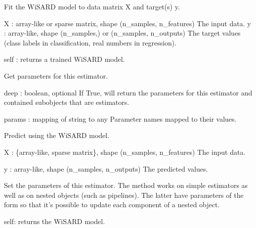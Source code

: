 \documentclass[letterpaper,10pt,english]{sphinxmanual}
\begin{document}
\begin{fulllineitems}
\begin{fulllineitems}
\label{\detokenize{index:wis.WisardClassifier.fit}}
Fit the WiSARD model to data matrix X and target(s) y.

X : array-like or sparse matrix, shape (n\_samples, n\_features)
The input data.
y : array-like, shape (n\_samples,) or (n\_samples, n\_outputs)
The target values (class labels in classification, real numbers in
regression).

self : returns a trained WiSARD model.

\end{fulllineitems}


\begin{fulllineitems}
\label{\detokenize{index:wis.WisardClassifier.get_params}}
Get parameters for this estimator.

deep : boolean, optional
If True, will return the parameters for this estimator and
contained subobjects that are estimators.

params : mapping of string to any
Parameter names mapped to their values.

\end{fulllineitems}


\begin{fulllineitems}
\label{\detokenize{index:wis.WisardClassifier.predict}}
Predict using the WiSARD model.

X : \{array-like, sparse matrix\}, shape (n\_samples, n\_features)
The input data.

y : array-like, shape (n\_samples, n\_outputs)
The predicted values.

\end{fulllineitems}


\begin{fulllineitems}
\label{\detokenize{index:wis.WisardClassifier.set_params}}
Set the parameters of this estimator.
The method works on simple estimators as well as on nested objects
(such as pipelines). The latter have parameters of the form
 so that it’s possible to update each
component of a nested object.

self: returns the WiSARD model.

\end{fulllineitems}


\end{fulllineitems}
\end{document}
